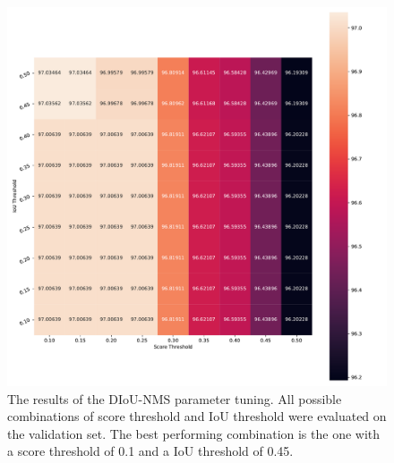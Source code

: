 \begin{figure}
\begin{center}
    \includegraphics[width=\columnwidth]{imgs/yolo_diou_heat.pdf}
    \caption{The results of the \ac{DIoU}-\ac{NMS} parameter tuning. All possible combinations of score threshold and \ac{IoU} threshold were evaluated on the validation set. The best performing combination is the one with a score threshold of 0.1 and a \ac{IoU} threshold of 0.45.}
    \label{fig:diou_nms_tuning}
\end{center}
\end{figure}

